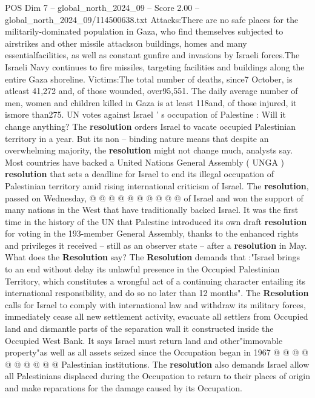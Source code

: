 \begin{textsample}{POS Dim 7 – global\_north\_2024\_09 – Score 2.00 – global\_north\_2024\_09/114500638.txt}  \label{ex:f7_pos_436}
Attacks:There are no safe places for the militarily-dominated population in Gaza, who find themselves subjected to airstrikes and other missile attackson buildings, homes and many essentialfacilities, as well as constant gunfire and invasions by Israeli forces.The Israeli Navy continues to fire missiles, targeting facilities and buildings along the entire Gaza shoreline.
Victims:The total number of deaths, since7 October, is atleast 41,272 and, of those wounded, over95,551.
The daily average number of men, women and children killed in Gaza is at least 118and, of those injured, it ismore than275.
UN votes against Israel ' s occupation of Palestine : Will it change anything?
The \textbf{resolution} orders Israel to vacate occupied Palestinian territory in a year.
But its non -- binding nature means that despite an overwhelming majority, the \textbf{resolution} might not change much, analysts say.
Most countries have backed a United Nations General Assembly ( UNGA ) \textbf{resolution} that sets a deadline for Israel to end its illegal occupation of Palestinian territory amid rising international criticism of Israel.
The \textbf{resolution}, passed on Wednesday, @ @ @ @ @ @ @ @ @ @ of Israel and won the support of many nations in the West that have traditionally backed Israel.
It was the first time in the history of the UN that Palestine introduced its own draft \textbf{resolution} for voting in the 193-member General Assembly, thanks to the enhanced rights and privileges it received -- still as an observer state -- after a \textbf{resolution} in May.
What does the \textbf{Resolution} say?
The \textbf{Resolution} demands that :"Israel brings to an end without delay its unlawful presence in the Occupied Palestinian Territory, which constitutes a wrongful act of a continuing character entailing its international responsibility, and do so no later than 12 months".
The \textbf{Resolution} calls for Israel to comply with international law and withdraw its military forces, immediately cease all new settlement activity, evacuate all settlers from Occupied land and dismantle parts of the separation wall it constructed inside the Occupied West Bank.
It says Israel must return land and other"immovable property"as well as all assets seized since the Occupation began in 1967 @ @ @ @ @ @ @ @ @ @ Palestinian institutions.
The \textbf{resolution} also demands Israel allow all Palestinians displaced during the Occupation to return to their places of origin and make reparations for the damage caused by its Occupation.

\end{textsample}
